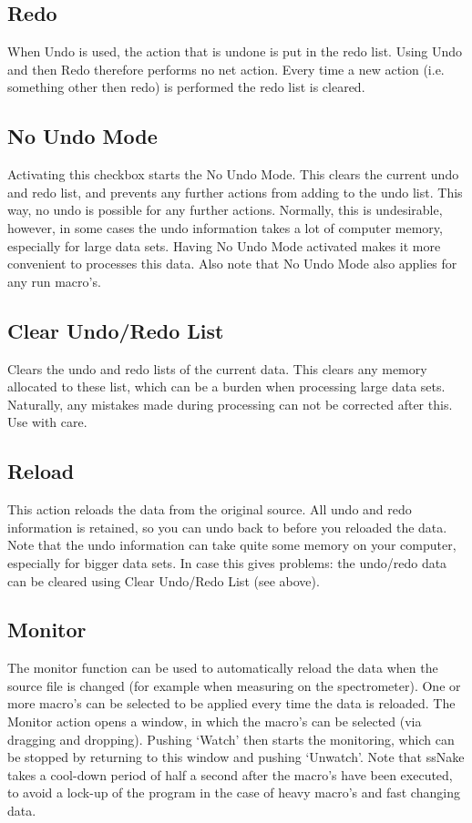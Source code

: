 \documentclass[11pt,a4paper]{article}
\begin{document}
\subsection{Redo}
When Undo is used, the action that is undone is put in the redo list. Using Undo and then Redo therefore performs no net action.
Every time a new action (i.e. something other then redo) is performed the redo list is cleared.

\subsection{No Undo Mode}
Activating this checkbox starts the No Undo Mode. This clears the current undo and redo list, and prevents any further actions from adding to the undo list. This way, no undo is possible
for any further actions. Normally, this is undesirable, however, in some cases the undo information takes a lot of computer memory, especially for large data sets.
Having No Undo Mode activated makes it more convenient to processes this data. Also note that No Undo Mode also applies for any run macro's.

\subsection{Clear Undo/Redo List}
Clears the undo and redo lists of the current data. This clears any memory allocated to these list, which can be a burden when processing large data sets.
Naturally, any mistakes made during processing can not be corrected after this. Use with care.





\subsection{Reload}
This action reloads the data from the original source. All undo and redo information is retained, so you can undo back to before you
reloaded the data. Note that the undo information can take quite some memory on your computer, especially for bigger data sets. In case
this gives problems: the undo/redo data can be cleared using Clear Undo/Redo List (see above).

\subsection{Monitor}
The monitor function can be used to automatically reload the data when the source file is changed (for example when measuring on the spectrometer). One or more macro's can be selected to be applied every time the data is reloaded. The Monitor action opens a window, in which the macro's can be selected (via dragging and dropping). Pushing `Watch' then starts the monitoring, which can be stopped by returning to this window and pushing `Unwatch'. Note that ssNake takes a cool-down period of half a second after the macro's have been executed, to avoid a lock-up of the program in the case of heavy macro's and fast changing data.
\end{document}
